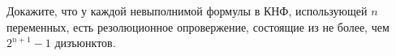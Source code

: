 Докажите, что у каждой невыполнимой формулы в КНФ, использующей $n$ переменных, есть резолюционное опровержение, состоящие из
не более, чем $2^{n + 1} - 1$ дизъюнктов.